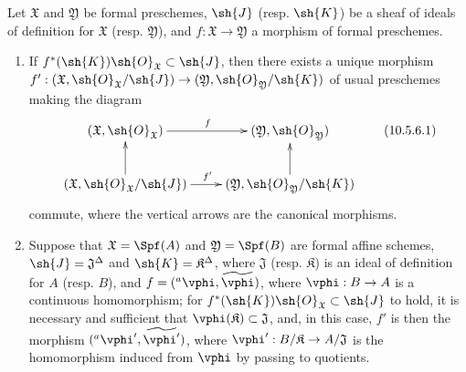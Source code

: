 \begin{proposition}[10.5.6]
\label{I.10.5.6}
Let $\mathfrak{X}$ and $\mathfrak{Y}$ be formal preschemes, $\sh{J}$ (resp. $\sh{K}$) be a sheaf of ideals of definition for $\mathfrak{X}$ (resp. $\mathfrak{Y}$), and $f:\mathfrak{X}\to\mathfrak{Y}$ a morphism of formal preschemes.
\begin{enumerate}
  \item[\rm{(i)}] If $f^*(\sh{K})\sh{O}_\mathfrak{X}\subset\sh{J}$, then there exists a unique morphism $f':(\mathfrak{X},\sh{O}_\mathfrak{X}/\sh{J})\to(\mathfrak{Y},\sh{O}_\mathfrak{Y}/\sh{K})$ of usual preschemes making the diagram
    \[
    \label{I.10.5.6.1}
      \xymatrix{
        (\mathfrak{X},\sh{O}_\mathfrak{X})\ar[r]^f &
        (\mathfrak{Y},\sh{O}_\mathfrak{Y})\\
        (\mathfrak{X},\sh{O}_\mathfrak{X}/\sh{J})\ar[r]^{f'}\ar[u] &
        (\mathfrak{Y},\sh{O}_\mathfrak{Y}/\sh{K})\ar[u]
      }
      \tag{10.5.6.1}
    \]
    commute, where the vertical arrows are the canonical morphisms.
  \item[\rm{(ii)}] Suppose that $\mathfrak{X}=\Spf(A)$ and $\mathfrak{Y}=\Spf(B)$ are formal affine schemes, $\sh{J}=\mathfrak{J}^\Delta$ and $\sh{K}=\mathfrak{K}^\Delta$, where $\mathfrak{J}$ (resp. $\mathfrak{K}$) is an ideal of definition for $A$ (resp. $B$), and $f=({}^a\vphi,\widetilde{\vphi})$, where $\vphi:B\to A$ is a continuous homomorphism;
    for $f^*(\sh{K})\sh{O}_\mathfrak{X}\subset\sh{J}$ to hold, it is necessary and sufficient that $\vphi(\mathfrak{K})\subset\mathfrak{J}$, and, in this case, $f'$ is then the morphism $({}^a\vphi',\widetilde{\vphi'})$, where $\vphi':B/\mathfrak{K}\to A/\mathfrak{J}$ is the homomorphism induced from $\vphi$ by passing to quotients.
\end{enumerate}
\end{proposition}

